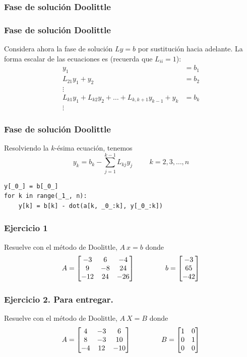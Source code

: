 \subsubsection{Fase de solución Doolittle}
\begin{frame}
\frametitle{Fase de solución Doolittle}
Considera ahora la fase de solución $Ly=b$ por sustitución hacia adelante. La forma escalar de las ecuaciones es (recuerda que $L_{ii}=1$):
\begin{align*}
		y_{1} &= b_{1} \\
		L_{21}y_{1}+y_{2} &=  b_{2} \\
		\vdots \\
		L_{k1}y_{1} + L_{k2}y_{2} + \ldots + L_{k,k+1} y_{k-1} + y_{k} &= b_{k} \\
		\vdots
\end{align*}
\end{frame}
\begin{frame}[fragile]
\frametitle{Fase de solución Doolittle}
Resolviendo la $k$-ésima ecuación, tenemos
\[ y_{k} = b_{k} - \sum_{j=1}^{k - 1} L_{kj}y_{j} \hspace{1cm} k=2,3,\ldots,n\]
\begin{lstlisting}[caption=Fase de solución, style=FormattedNumber, basicstyle=\linespread{1.1}\ttfamily=\small, columns=fullflexible]
y[_0_] = b[_0_]
for k in range(_1_, n):
    y[k] = b[k] - dot(a[k, _0_:k], y[_0_:k])
\end{lstlisting}
\end{frame}
\begin{frame}
\frametitle{Ejercicio 1}
Resuelve con el método de Doolittle, $A \: x = b$ donde
\[ A =
\begin{bmatrix}
-3 & 6 & -4 \\
9 & -8 & 24 \\
-12 & 24 & -26 
\end{bmatrix}
\hspace{1.5cm} b =
\begin{bmatrix}
-3 \\
65 \\
-42
\end{bmatrix} \]
\end{frame}
\begin{frame}
\frametitle{Ejercicio 2. Para entregar.}
Resuelve con el método de Doolittle, $A \: X = B$ donde
\[ A = 
	\begin{bmatrix}
		4 & -3 & 6 \\
		8 & -3 & 10 \\
		-4 & 12 & -10 
	\end{bmatrix}
	\hspace{1.5cm} B =
	\begin{bmatrix}
		1 & 0 \\
		0 & 1 \\
		0 & 0
	\end{bmatrix} \]
\end{frame}
